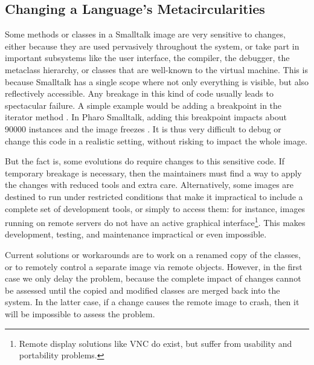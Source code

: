 
\subsection{Changing a Language's Metacircularities}

Some methods or classes in a Smalltalk image are very sensitive to changes, either because they are used pervasively throughout the system, or take part in important subsystems like the user interface, the compiler, the debugger, the metaclass hierarchy, or classes that are well-known to the virtual machine.
This is because Smalltalk has a single scope where not only everything is visible, but also reflectively accessible.
Any breakage in this kind of code usually leads to spectacular failure. A simple example would be adding a breakpoint in the iterator method . In Pharo Smalltalk, adding this breakpoint impacts about 90000  instances and the image freezes \cite{Denk08b}.
It is thus very difficult to debug or change this code in a realistic setting, without risking to impact the whole image.

But the fact is, some evolutions do require changes to this sensitive code.
If temporary breakage is necessary, then the maintainers must find a way to apply the changes with reduced tools and extra care.
Alternatively, some images are destined to run under restricted conditions that make it impractical to include a complete set of development tools, or simply to access them: for instance, images running on remote servers do not have an active graphical interface\footnote{Remote display solutions like VNC do exist, but suffer from usability and portability problems.}.
This makes development, testing, and maintenance impractical or even impossible.

Current solutions or workarounds are to work on a renamed copy of the classes, or to remotely control a separate image via remote objects.
However, in the first case we only delay the problem, because the complete impact of changes cannot be assessed until the copied and modified classes are merged back into the system.
In the latter case, if a change causes the remote image to crash, then it will be impossible to assess the problem.

